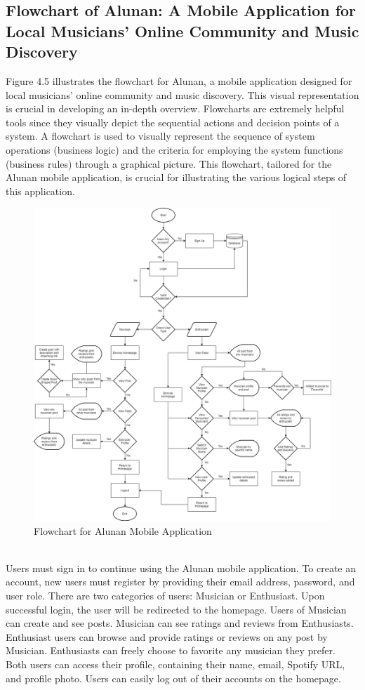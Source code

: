 \subsection{Flowchart of Alunan: A Mobile Application for Local Musicians’ Online Community and Music Discovery}
Figure 4.5 illustrates the flowchart for Alunan, a mobile application designed for local musicians' online community and music discovery. This visual representation is crucial in developing an in-depth overview. Flowcharts are extremely helpful tools since they visually depict the sequential actions and decision points of a system. A flowchart is used to visually represent the sequence of system operations (business logic) and the criteria for employing the system functions (business rules) through a graphical picture. This flowchart, tailored for the Alunan mobile application, is crucial for illustrating the various logical steps of this application. \pagebreak
\begin{figure}[h]
    \centering
    \includegraphics[width=1.0\linewidth]{mainmatter/images/flowchart.png}
    \caption{Flowchart for Alunan Mobile Application}
    \label{fig:myfig44}
\end{figure} \\
Users must sign in to continue using the Alunan mobile application. To create an account, new users must register by providing their email address, password, and user role. There are two categories of users: Musician or Enthusiast. Upon successful login, the user will be redirected to the homepage. Users of Musician can create and see posts. Musician can see ratings and reviews from Enthusiasts. Enthusiast users can browse and provide ratings or reviews on any post by Musician. Enthusiasts can freely choose to favorite any musician they prefer. Both users can access their profile, containing their name, email, Spotify URL, and profile photo. Users can easily log out of their accounts on the homepage.
\pagebreak

